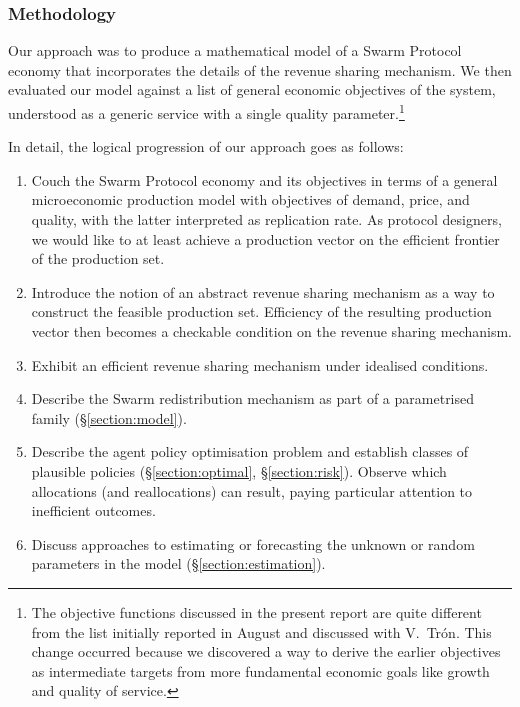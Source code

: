 \subsubsection{Methodology}
%
Our approach was to produce a mathematical model of a Swarm Protocol economy that incorporates the details of the revenue sharing mechanism.
%
We then evaluated our model against a list of general economic objectives of the system, understood as a generic service with a single quality parameter.\footnote{The objective functions discussed in the present report are quite different from the list initially reported in August and discussed with V.~Tr\'{o}n.
%
This change occurred because we discovered a way to derive the earlier objectives as intermediate targets from more fundamental economic goals like growth and quality of service.}

In detail, the logical progression of our approach goes as follows:
\begin{enumerate}

  \item 
    Couch the Swarm Protocol economy and its objectives in terms of a general microeconomic production model with objectives of demand, price, and quality, with the latter interpreted as replication rate.
    As protocol designers, we would like to at least achieve a production vector on the efficient frontier of the production set.
  
  \item
    Introduce the notion of an abstract revenue sharing mechanism as a way to construct the feasible production set.
    Efficiency of the resulting production vector then becomes a checkable condition on the revenue sharing mechanism.

  \item
    Exhibit an efficient revenue sharing mechanism under idealised conditions.

  \item
    Describe the Swarm redistribution mechanism as part of a parametrised family (\S\ref{section:model}).

  \item
    Describe the agent policy optimisation problem and establish classes of plausible policies (\S\ref{section:optimal}, \S\ref{section:risk}).
    Observe which allocations (and reallocations) can result, paying particular attention to inefficient outcomes.
    
  \item
    Discuss approaches to estimating or forecasting the unknown or random parameters in the model (\S\ref{section:estimation}).

\end{enumerate}




